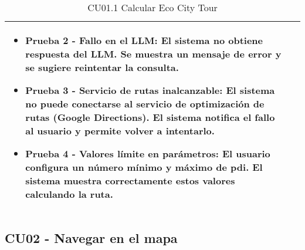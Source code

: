 \begin{table}[H]
\begin{tabularx}{\linewidth}{ p{} p{} }
\begin{itemize}
			\vspace{2pt}
			\item \textbf{Prueba 2 - Fallo en el LLM:} El sistema no obtiene respuesta del LLM. Se muestra un mensaje de error y se sugiere reintentar la consulta.
			\vspace{2pt}
			\item \textbf{Prueba 3 - Servicio de rutas inalcanzable:} El sistema no puede conectarse al servicio de optimización de rutas (Google Directions). El sistema notifica el fallo al usuario y permite volver a intentarlo.
			\vspace{2pt}
			\item \textbf{Prueba 4 - Valores límite en parámetros:} El usuario configura un número mínimo y máximo de \acrshort{pdi}. El sistema muestra correctamente estos valores calculando la ruta.
		\end{itemize} \\
		\bottomrule
	\end{tabularx}
	\caption{CU01.1 Calcular Eco City Tour}
	\label{cu:calcular-tour}
\end{table}


\subsection{CU02 - Navegar en el mapa}


